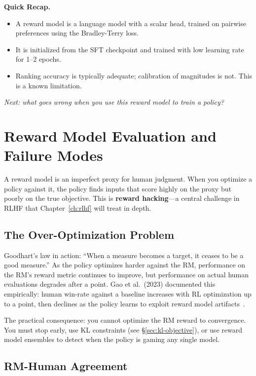 \begin{quickrecap}
\textbf{Quick Recap.}
\begin{itemize}[nosep,leftmargin=1.5em]
  \item A reward model is a language model with a scalar head, trained on pairwise preferences using the Bradley-Terry loss.
  \item It is initialized from the SFT checkpoint and trained with low learning rate for 1--2 epochs.
  \item Ranking accuracy is typically adequate; calibration of magnitudes is not. This is a known limitation.
\end{itemize}
\textit{Next: what goes wrong when you use this reward model to train a policy?}
\end{quickrecap}


\section{Reward Model Evaluation and Failure Modes}
\label{sec:rm-failures}

A reward model is an imperfect proxy for human judgment. When you optimize a policy against it, the policy finds inputs that score highly on the proxy but poorly on the true objective. This is \textbf{reward hacking}---a central challenge in RLHF that Chapter~\ref{ch:rlhf} will treat in depth.

\subsection{The Over-Optimization Problem}

Goodhart's law in action: ``When a measure becomes a target, it ceases to be a good measure.'' As the policy optimizes harder against the RM, performance on the RM's reward metric continues to improve, but performance on actual human evaluations degrades after a point. Gao et al.~(2023) documented this empirically: human win-rate against a baseline increases with RL optimization up to a point, then declines as the policy learns to exploit reward model artifacts~\cite{gao2023scaling}.

The practical consequence: you cannot optimize the RM reward to convergence. You must stop early, use KL constraints (see \S\ref{sec:kl-objective}), or use reward model ensembles to detect when the policy is gaming any single model.

\subsection{RM-Human Agreement}

